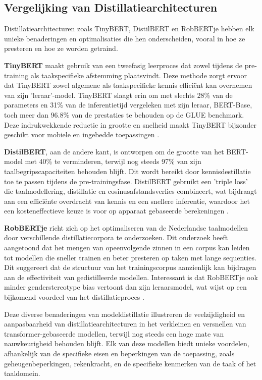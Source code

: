 \subsection{Vergelijking van Distillatiearchitecturen}

Distillatiearchitecturen zoals TinyBERT, DistilBERT en RobBERTje hebben elk unieke benaderingen en optimalisaties die hen onderscheiden, vooral in hoe ze presteren en hoe ze worden getraind.

\textbf{TinyBERT} maakt gebruik van een tweefasig leerproces dat zowel tijdens de pre-training als taakspecifieke afstemming plaatsvindt. Deze methode zorgt ervoor dat TinyBERT zowel algemene als taakspecifieke kennis efficiënt kan overnemen van zijn 'leraar'-model. TinyBERT slaagt erin om met slechts 28\% van de parameters en 31\% van de inferentietijd vergeleken met zijn leraar, BERT-Base, toch meer dan 96.8\% van de prestaties te behouden op de GLUE benchmark. Deze indrukwekkende reductie in grootte en snelheid maakt TinyBERT bijzonder geschikt voor mobiele en ingebedde toepassingen \autocite{Jiao2019TinyBERT}.

\textbf{DistilBERT}, aan de andere kant, is ontworpen om de grootte van het BERT-model met 40\% te verminderen, terwijl nog steeds 97\% van zijn taalbegripscapaciteiten behouden blijft. Dit wordt bereikt door kennisdestillatie toe te passen tijdens de pre-trainingsfase. DistilBERT gebruikt een 'triple loss' die taalmodellering, distillatie en cosinusafstandsverlies combineert, wat bijdraagt aan een efficiënte overdracht van kennis en een snellere inferentie, waardoor het een kosteneffectieve keuze is voor op apparaat gebaseerde berekeningen \autocite{Sanh2019DistilBERT}.

\textbf{RobBERTje} richt zich op het optimaliseren van de Nederlandse taalmodellen door verschillende distillatiecorpora te onderzoeken. Dit onderzoek heeft aangetoond dat het mengen van opeenvolgende zinnen in een corpus kan leiden tot modellen die sneller trainen en beter presteren op taken met lange sequenties. Dit suggereert dat de structuur van het trainingscorpus aanzienlijk kan bijdragen aan de effectiviteit van gedistilleerde modellen. Interessant is dat RobBERTje ook minder genderstereotype bias vertoont dan zijn leraarsmodel, wat wijst op een bijkomend voordeel van het distillatieproces \autocite{Delobelle2021}.

Deze diverse benaderingen van modeldistillatie illustreren de veelzijdigheid en aanpasbaarheid van distillatiearchitecturen in het verkleinen en versnellen van trans\-for\-mer-gebaseerde modellen, terwijl nog steeds een hoge mate van nauwkeurigheid behouden blijft. Elk van deze modellen biedt unieke voordelen, afhankelijk van de specifieke eisen en beperkingen van de toepassing, zoals geheugenbeperkingen, rekenkracht, en de specifieke kenmerken van de taak of het taaldomein.


